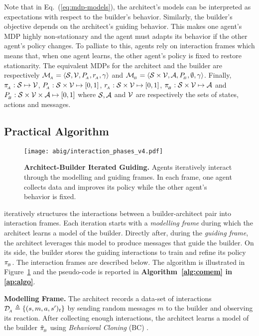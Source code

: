 Note that in Eq.~(\ref{eq:mdp-models}), the architect's models can be interpreted as expectations with respect to the builder's behavior. Similarly, the builder's objective depends on the architect's guiding behavior. This makes one agent's MDP highly non-stationary and the agent must adapts its behavior if the other agent's policy changes. To palliate to this, agents rely on interaction frames which means that, when one agent learns, the other agent's policy is fixed to restore stationarity. The equivalent MDPs for the architect and the builder are respectively ${\mathcal{M}}_{\!_A} = \langle {\mathcal{S}}, {\mathcal{V}}, P_{\!_A}, r_{\!_A}, \gamma \rangle$ and ${\mathcal{M}}_{\!_B} = \langle {\mathcal{S}} \times {\mathcal{V}}, {\mathcal{A}}, P_{\!_B}, \emptyset, \gamma \rangle$. Finally, $\pi_{\!_A}:{\mathcal{S}} \mapsto {\mathcal{V}}$, $P_{\!_A}:{\mathcal{S}}\times{\mathcal{V}}\mapsto[0,1]$, $r_{\!_A}:{\mathcal{S}}\times{\mathcal{V}}\mapsto[0,1]$, $\pi_{\!_B}:{\mathcal{S}}\times{\mathcal{V}}\mapsto{\mathcal{A}}$ and $P_{\!_B}:{\mathcal{S}}\times{\mathcal{V}}\times{\mathcal{A}}\mapsto[0,1]$ where ${\mathcal{S}}, {\mathcal{A}}$ and ${\mathcal{V}}$ are respectively the sets of states, actions and messages. 

\subsection{Practical Algorithm}
\label{subsec:practical_algo}
\begin{figure}[!h]
    \centering
    \texttt{[image: abig/interaction\_phases\_v4.pdf]}
    \caption{\textbf{Architect-Builder Iterated Guiding.} Agents iteratively interact through the modelling and guiding frames. In each frame, one agent collects data and improves its policy while the other agent's behavior is fixed.}
    \label{fig:agent-interact}
\end{figure}

\abig iteratively structures the interactions between a builder-architect pair into interaction frames. Each iteration starts with a \textit{modelling frame} during which the architect learns a model of the builder. Directly after, during the \textit{guiding frame}, the architect leverages this model to produce messages that guide the builder. On its side, the builder stores the guiding interactions to train and refine its policy $\pi_{\!_B}$. The interaction frames are described below. The algorithm is illustrated in Figure~\ref{fig:agent-interact} and the pseudo-code is reported in \textbf{Algorithm~\ref{alg:comem} in \ap\ref{ap:algo}}.

\textbf{Modelling Frame. } The architect records a data-set of interactions $\mathcal{D}_{\!_A} \triangleq \{(s,m,a,s')_t\}$ by sending random messages $m$ to the builder and observing its reaction. After collecting enough interactions, the architect learns a model of the builder $\tilde{\pi}_{\!_B}$ using \textit{Behavioral Cloning} (BC) \cite{pomerleau1991efficient}.

